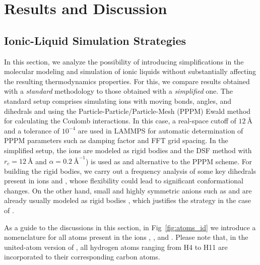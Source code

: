 \documentclass[3p,twocolumn]{elsarticle}
\begin{document}
\section{Results and Discussion}
\label{sec:results}

\subsection{Ionic-Liquid Simulation Strategies}
\label{sec:prel_results}

In this section, we analyze the possibility of introducing simplifications in the molecular modeling and simulation of ionic liquids without substantially affecting the resulting thermodynamics properties.
For this, we compare results obtained with a \textit{standard} methodology to those obtained with a \textit{simplified} one.
The standard setup comprises simulating ions with moving bonds, angles, and dihedrals and using the Particle-Particle/Particle-Mesh (PPPM) Ewald method \cite{Hockney_1988} for calculating the Coulomb interactions.
In this case, a real-space cutoff of $12~\text{\AA}$ and a tolerance of $10^{-4}$ are used in LAMMPS for automatic determination of PPPM parameters such as damping factor and FFT grid spacing.
In the simplified setup, the ions are modeled as rigid bodies and the DSF method \cite{Fennell2006} with $r_c = 12 ~\text{\AA}$ and $\alpha = 0.2 ~\text{\AA}^{-1}$) is used as and alternative to the PPPM scheme.
For building the rigid bodies, we carry out a frequency analysis of some key dihedrals present in ions \ce{[emim]^+} and \ce{[NTf_2]^-}, whose flexibility could lead to significant conformational changes.
On the other hand, small and highly symmetric anions such as  and  are already usually modeled as rigid bodies \cite{HANKE_2001,Hanke_2003,Lynden_Bell_2006}, which justifies the strategy in the case of \ce{[B(CN)_4]^-}.

As a guide to the discussions in this section, in Fig~\ref{fig:atoms_id} we introduce a nomenclature for all atoms present in the ions \ce{[emim]^+}, \ce{[B(CN)_4]^-}, and \ce{[NTf_2]^-}.
Please note that, in the united-atom version of \ce{[emim]^+}, all hydrogen atoms ranging from H4 to H11 are incorporated to their corresponding carbon atoms.
\end{document}
